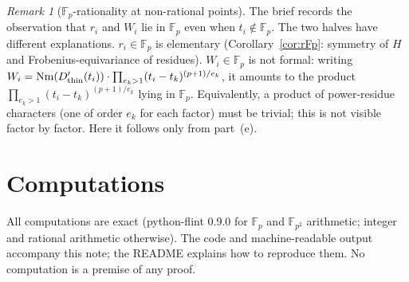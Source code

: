 \documentclass[11pt,a4paper]{article}
\numberwithin{equation}{section}
\theoremstyle{definition}
\theoremstyle{remark}
\newtheorem{remark}[theorem]{Remark}
\newcommand{\Fp}{\mathbb F_p}
\newcommand{\Fq}{\mathbb F_{p^2}}
\begin{document}
\begin{remark}[$\Fp$-rationality at non-rational points]
The brief records the observation that $r_i$ and $W_i$ lie in $\Fp$ even when $t_i\notin\Fp$. The
two halves have different explanations. $r_i\in\Fp$ is elementary (Corollary~\ref{cor:rFp}: symmetry
of $H$ and Frobenius-equivariance of residues). $W_i\in\Fp$ is not formal: writing
$W_i=\mathrm{Nm}(D_{\rm thin}'(t_i))\cdot\prod_{e_k>1}(t_i-t_k)^{(p+1)/e_k}$, it amounts to the product
$\prod_{e_k>1}(t_i-t_k)^{(p+1)/e_k}$ lying in $\Fp$. Equivalently, a product of power-residue characters (one of order $e_k$ for each factor) must be trivial; this is not visible factor by factor. Here it follows only
from part~(e).
\end{remark}

\section{Computations}\label{sec:comp}

All computations are exact (python-flint 0.9.0 for $\Fp$ and $\Fq$ arithmetic; integer and rational
arithmetic otherwise). The code and machine-readable output accompany this note; the README
explains how to reproduce them. No computation is a premise of any proof.
\end{document}

